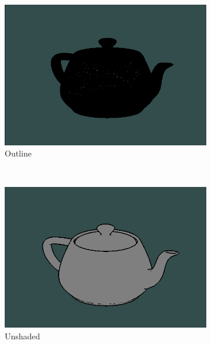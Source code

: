 \begin{figure}[h]
    \centering
    \begin{subfigure}[b]{0.2\textwidth}
        \includegraphics[width=\textwidth]{img/teapot-wireframe.png}
        \caption{Outline}
        \label{fig:outline-render}
    \end{subfigure}
    ~
    \begin{subfigure}[b]{0.2\textwidth}
        \includegraphics[width=\textwidth]{img/teapot-outline-noshade.png}
        \caption{Unshaded}
        \label{fig:model-noshade}
    \end{subfigure}
    ~
    \begin{subfigure}[b]{0.2\textwidth}

\end{subfigure}
\end{figure}

